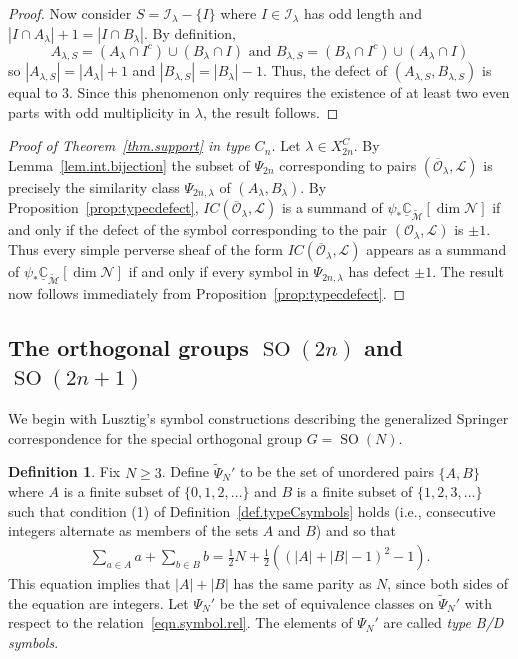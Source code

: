 \documentclass[reqno,11pt]{amsart}
\theoremstyle{remark}
\theoremstyle{remark}
\theoremstyle{definition}
\theoremstyle{definition}
\theoremstyle{definition}
\newtheorem{Def}[Thm]{Definition}
\numberwithin{equation}{section}
\newcommand{\C}{\mathbb{C}}           %
\newcommand{\SO}{\operatorname{SO}}
\newcommand{\ci}{\mathcal{I}}
\newcommand{\cl}{\mathcal{L}}
\newcommand{\cm}{\mathcal{M}}
\newcommand{\cn}{\mathcal{N}}
\newcommand{\co}{\mathcal{O}}
\newcommand{\shc}{\underline{\C}}
\renewcommand{\tilde}{\widetilde}
\begin{document}
\begin{proof}
Now consider $S = \mathcal I_\lambda - \{I\}$ where $I\in \ci_\lambda$ has odd length and $|I\cap A_\lambda|+1 = |I\cap B_\lambda|$.  By definition, 
\[
A_{\lambda, S} = (A_\lambda \cap I^c) \cup (B_\lambda \cap I) \text{ and } B_{\lambda, S} = (B_\lambda \cap I^c) \cup (A_\lambda \cap I)
\] 
so $|A_{\lambda,S} | = |A_{\lambda} |+1$ and $|B_{\lambda,S} | = |B_{\lambda} |-1$.  Thus, the defect of $(A_{\lambda,S},B_{\lambda,S})$ is equal to $3$.  Since this phenomenon only requires the existence of at least two even parts with odd multiplicity in $\lambda$, the result follows.
\end{proof}



\begin{proof}[Proof of Theorem~\ref{thm.support} in type $C_n$]
Let $\lambda\in X_{2n}^C$.   By Lemma~\ref{lem.int.bijection} the subset of $\Psi_{2n}$ corresponding to pairs $(\overline{\co}_\lambda, \cl)$ is precisely the similarity class $\Psi_{2n,\lambda}$ of $(A_\lambda, B_\lambda)$. 
By Proposition~\ref{prop:typecdefect}, $IC(\overline{\co}_\lambda, \cl)$ is a summand of $\psi_*\shc_{\tilde{\cm}}[\dim \cn]$ if and only if the defect of the symbol corresponding to the pair $(\co_\lambda, \cl)$ is $\pm1$.  Thus every simple perverse sheaf of the form $IC(\overline{\co}_\lambda, \cl)$ appears as a summand of $\psi_*\shc_{\tilde{\cm}}[\dim \cn]$ if and only if every symbol in $\Psi_{2n,\lambda}$ has defect $\pm 1$.  The result now follows immediately from Proposition~\ref{prop:typecdefect}.
\end{proof}


\subsection{The orthogonal groups $\SO(2n)$ and $\SO(2n+1)$} \label{sec.BDsymbols}

We begin with Lusztig's symbol constructions describing the generalized Springer correspondence for the special orthogonal group $G=\SO(N)$. 


\begin{Def}
Fix $N\geq 3$. Define $\widetilde \Psi_{N}'$ to be the set of unordered pairs $\{A,B\}$ where $A$ is a finite subset of $\{0,1,2,\dots\}$ and $B$ is a finite subset of $\{1,2,3,\dots\}$ such that condition (1) of Definition~\ref{def.typeCsymbols} holds (i.e., consecutive integers alternate as members of the sets $A$ and $B$) and so that 
\begin{eqnarray}\label{eqn.typeBD}
\sum_{a\in A} a + \sum_{b\in B} b = \frac{1}{2}N + \frac{1}{2} \left( \left(|A|+|B| -1 \right)^2 -1\right).
\end{eqnarray}
This equation implies that  $|A|+|B|$ has the same parity as $N$, since both sides of the equation are integers.  
Let $\Psi_{N}'$ be the set of equivalence classes on $\widetilde\Psi_{N}'$ with respect to the relation~\eqref{eqn.symbol.rel}.  
The elements of $\Psi_N'$ are called \emph{type B/D symbols}. 
\end{Def}
\end{document}
